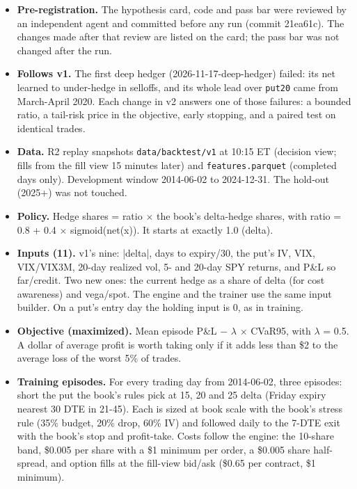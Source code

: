 \documentclass{article}
\begin{document}
\begin{itemize}

\item \textbf{Pre-registration.} The hypothesis card, code and pass bar were reviewed by an independent agent and committed before any run (commit 21ea61c). The changes made after that review are listed on the card; the pass bar was not changed after the run.

\item \textbf{Follows v1.} The first deep hedger (2026-11-17-deep-hedger) failed: its net learned to under-hedge in selloffs, and its whole lead over \texttt{put20} came from March-April 2020. Each change in v2 answers one of those failures: a bounded ratio, a tail-risk price in the objective, early stopping, and a paired test on identical trades.

\item \textbf{Data.} R2 replay snapshots \texttt{data/\allowbreak{}backtest/\allowbreak{}v1} at 10:15 ET (decision view; fills from the fill view 15 minutes later) and \texttt{features.parquet} (completed days only). Development window 2014-06-02 to 2024-12-31. The hold-out (2025+) was not touched.

\item \textbf{Policy.} Hedge shares = ratio \ensuremath{\times} the book's delta-hedge shares, with ratio = 0.8 + 0.4 \ensuremath{\times} sigmoid(net(x)). It starts at exactly 1.0 (delta).

\item \textbf{Inputs (11).} v1's nine: |delta|, days to expiry/30, the put's IV, VIX, VIX/VIX3M, 20-day realized vol, 5- and 20-day SPY returns, and P\&L so far/credit. Two new ones: the current hedge as a share of delta (for cost awareness) and vega/spot. The engine and the trainer use the same input builder. On a put's entry day the holding input is 0, as in training.

\item \textbf{Objective (maximized).} Mean episode P\&L $-$ \ensuremath{\lambda} \ensuremath{\times} CVaR95, with \ensuremath{\lambda} = 0.5. A dollar of average profit is worth taking only if it adds less than \$2 to the average loss of the worst 5\% of trades.

\item \textbf{Training episodes.} For every trading day from 2014-06-02, three episodes: short the put the book's rules pick at 15, 20 and 25 delta (Friday expiry nearest 30 DTE in 21-45). Each is sized at book scale with the book's stress rule (35\% budget, 20\% drop, 60\% IV) and followed daily to the 7-DTE exit with the book's stop and profit-take. Costs follow the engine: the 10-share band, \$0.005 per share with a \$1 minimum per order, a \$0.005 share half-spread, and option fills at the fill-view bid/ask (\$0.65 per contract, \$1 minimum).


\end{itemize}
\end{document}
